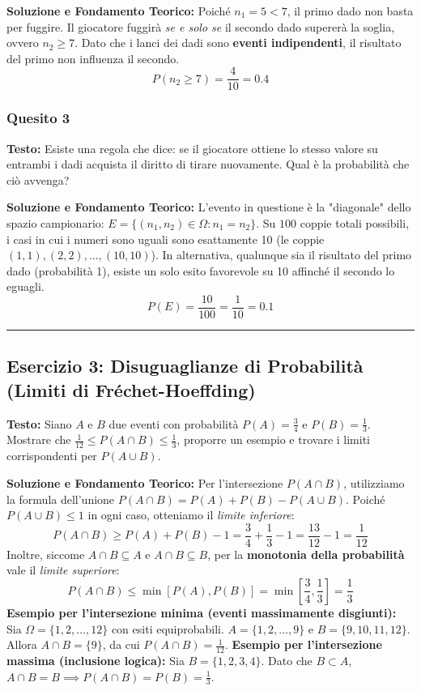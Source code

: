 \documentclass[12pt, a4paper]{article}
\begin{document}
\textbf{Soluzione e Fondamento Teorico:} 
Poiché $n_1 = 5 < 7$, il primo dado non basta per fuggire. Il giocatore fuggirà \textit{se e solo se} il secondo dado supererà la soglia, ovvero $n_2 \ge 7$. Dato che i lanci dei dadi sono \textbf{eventi indipendenti}, il risultato del primo non influenza il secondo.
$$ P(n_2 \ge 7) = \frac{4}{10} = 0.4 $$

\subsubsection*{Quesito 3}
\textbf{Testo:} Esiste una regola che dice: se il giocatore ottiene lo stesso valore su entrambi i dadi acquista il diritto di tirare nuovamente. Qual è la probabilità che ciò avvenga?

\textbf{Soluzione e Fondamento Teorico:} 
L'evento in questione è la "diagonale" dello spazio campionario: $E = \{(n_1, n_2) \in \Omega : n_1 = n_2\}$.
Su $100$ coppie totali possibili, i casi in cui i numeri sono uguali sono esattamente 10 (le coppie $(1,1), (2,2), \dots, (10,10)$). In alternativa, qualunque sia il risultato del primo dado (probabilità 1), esiste un solo esito favorevole su 10 affinché il secondo lo eguagli.
$$ P(E) = \frac{10}{100} = \frac{1}{10} = 0.1 $$

\vspace{0.5cm}\hrule\vspace{0.5cm}

\subsection*{Esercizio 3: Disuguaglianze di Probabilità (Limiti di Fréchet-Hoeffding)}
\textbf{Testo:} Siano $A$ e $B$ due eventi con probabilità $P(A)=\frac{3}{4}$ e $P(B)=\frac{1}{3}$. Mostrare che $\frac{1}{12} \le P(A \cap B) \le \frac{1}{3}$, proporre un esempio e trovare i limiti corrispondenti per $P(A \cup B)$.

\textbf{Soluzione e Fondamento Teorico:} 
Per l'intersezione $P(A \cap B)$, utilizziamo la formula dell'unione $P(A \cap B) = P(A) + P(B) - P(A \cup B)$. Poiché $P(A \cup B) \le 1$ in ogni caso, otteniamo il \textit{limite inferiore}:
$$ P(A \cap B) \ge P(A) + P(B) - 1 = \frac{3}{4} + \frac{1}{3} - 1 = \frac{13}{12} - 1 = \frac{1}{12} $$
Inoltre, siccome $A \cap B \subseteq A$ e $A \cap B \subseteq B$, per la \textbf{monotonia della probabilità} vale il \textit{limite superiore}:
$$ P(A \cap B) \le \min[P(A), P(B)] = \min\left[\frac{3}{4}, \frac{1}{3}\right] = \frac{1}{3} $$
\textbf{Esempio per l'intersezione minima (eventi massimamente disgiunti):} 
Sia $\Omega = \{1, 2, \dots, 12\}$ con esiti equiprobabili. 
$A = \{1, 2, \dots, 9\}$ e $B = \{9, 10, 11, 12\}$. Allora $A \cap B = \{9\}$, da cui $P(A \cap B) = \frac{1}{12}$.
\textbf{Esempio per l'intersezione massima (inclusione logica):} 
Sia $B = \{1, 2, 3, 4\}$. Dato che $B \subset A$, $A \cap B = B \implies P(A \cap B) = P(B) = \frac{1}{3}$.
\end{document}

